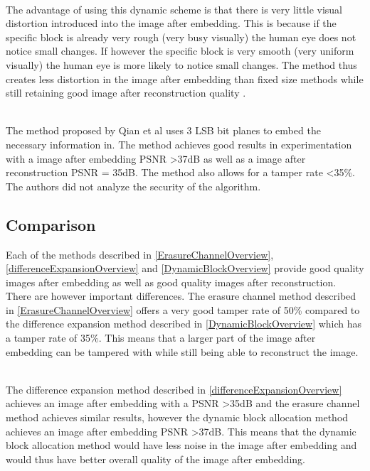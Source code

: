\documentclass[12pt]{article}
\begin{document}
\hspace{0pt} \\
The advantage of using this dynamic scheme is that there is very little visual distortion introduced into the image after embedding. 
This is because if the specific block is already very rough (very busy visually) the human eye does not notice small changes.
If however the specific block is very smooth (very uniform visually) the human eye is more likely to notice small changes.
The method thus creates less distortion in the image after embedding than fixed size methods while still retaining good image after reconstruction quality \cite{qian2011image}. 

\hspace{0pt} \\
The method proposed by Qian et al \cite{qian2011image} uses 3 LSB bit planes
to embed the necessary information in.
The method achieves good results in experimentation with a image after embedding PSNR \textgreater 37dB as well as a image after reconstruction PSNR = 35dB.
The method also allows for a tamper rate \textless 35\%.
The authors did not analyze the security of the algorithm.

\subsection{Comparison}
\label{litStudyCamparison}
Each of the methods described in \ref{ErasureChannelOverview}, \ref{differenceExpansionOverview} and \ref{DynamicBlockOverview} provide good quality images after embedding as well as good quality images after reconstruction.
There are however important differences.
The erasure channel method described in \ref{ErasureChannelOverview} offers a very good tamper rate of 50\% compared to the difference expansion method described in \ref{DynamicBlockOverview} which has a tamper rate of 35\%.
This means that a larger part of the image after embedding can be tampered with while still being able to reconstruct the image.

\hspace{0pt} \\
The difference expansion method described in \ref{differenceExpansionOverview} achieves an image after embedding with a PSNR \textgreater 35dB and the erasure channel method achieves similar results, however the dynamic block allocation method achieves an image after embedding PSNR \textgreater 37dB.
This means that the dynamic block allocation method would have less noise in the image after embedding and would thus have better overall quality of the image after embedding.
\end{document}
